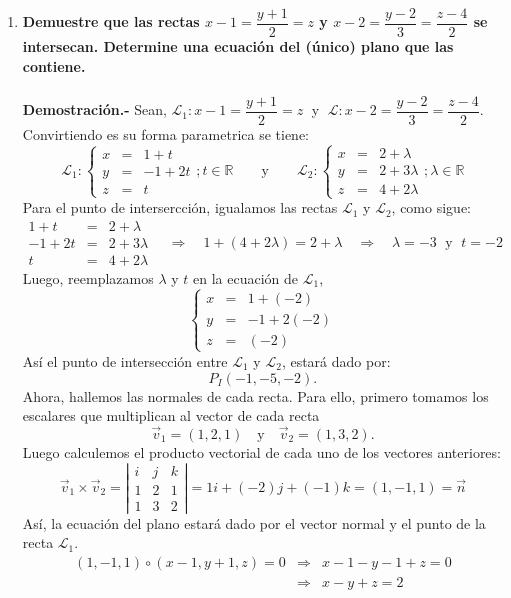 \begin{enumerate}
    \item \textbf{\boldmath Demuestre que las rectas $x-1=\dfrac{y+1}{2}=z$ y $x-2=\dfrac{y-2}{3}=\dfrac{z-4}{2}$ se intersecan. Determine una ecuación del (único) plano que las contiene.\\\\
	Demostración.-}\; Sean, $\mathscr{L}_1 : x-1=\dfrac{y+1}{2}=z\;$ y $\;\mathscr{L}:x-2=\dfrac{y-2}{3}=\dfrac{z-4}{2}$. Convirtiendo es su forma parametrica se tiene:
	$$
	\mathscr{L}_1 : \left\{\begin{array}{rcl}
		x &=& 1+t\\
		y &=& -1+2t\\
		z &=& t
	\end{array}\right.;t\in \mathbb{R}\qquad \mbox{y}\qquad
	\mathscr{L}_2 : \left\{\begin{array}{rcl}
		x &=& 2+\lambda\\
		y &=& 2+3\lambda\\
		z &=& 4+2\lambda
	\end{array}\right.;\lambda\in \mathbb{R}
	$$
	Para el punto de intersercción, igualamos las rectas $\mathscr{L}_1$ y $\mathscr{L}_2$, como sigue:
	$$
	\begin{array}{rcl}
		1+t &=& 2+\lambda\\
		-1+2t &=& 2+3\lambda\\
		t &=& 4+2\lambda
	\end{array}
	\quad \Rightarrow \quad 
	1+(4+2\lambda)=2+\lambda
	\quad \Rightarrow \quad 
	\lambda = -3 \; \mbox{ y } \; t = -2
	$$
	Luego, reemplazamos $\lambda$ y $t$ en la ecuación de $\mathscr{L}_1$,
	$$
	\left\{\begin{array}{rcl}
		x &=& 1+(-2)\\
		y &=& -1+2(-2)\\
		z &=& (-2)
	\end{array}\right.
	$$
	Así el punto de intersección entre $\mathscr{L}_1$ y $\mathscr{L}_2$, estará dado por:
	$$P_I(-1,-5,-2).$$
	Ahora, hallemos las normales de cada recta. Para ello, primero tomamos los escalares que multiplican al vector de cada recta
	$$\vec{v}_1 = (1,2,1)\quad \mbox{y}\quad \vec{v}_2 = (1,3,2).$$
	Luego calculemos el producto vectorial de cada uno de los vectores anteriores:
	$$
	\vec{v}_1\times \vec{v}_2 = \left|\begin{array}{rcl}
		i & j & k\\
		1 & 2 & 1\\
		1 & 3 & 2
	\end{array}\right| = 1i+(-2)j+(-1)k = (1,-1,1)=\vec{n}
	$$
	Así, la ecuación del plano estará dado por el vector normal y el punto de la recta $\mathscr{L}_1$.
	$$\begin{array}{rcl}
	    (1,-1,1)\circ(x-1,y+1,z)=0 &\Rightarrow& x-1-y-1+z=0\\
				       &\Rightarrow& x-y+z=2
	\end{array}$$
	\vspace{0.5cm}


\end{enumerate}
